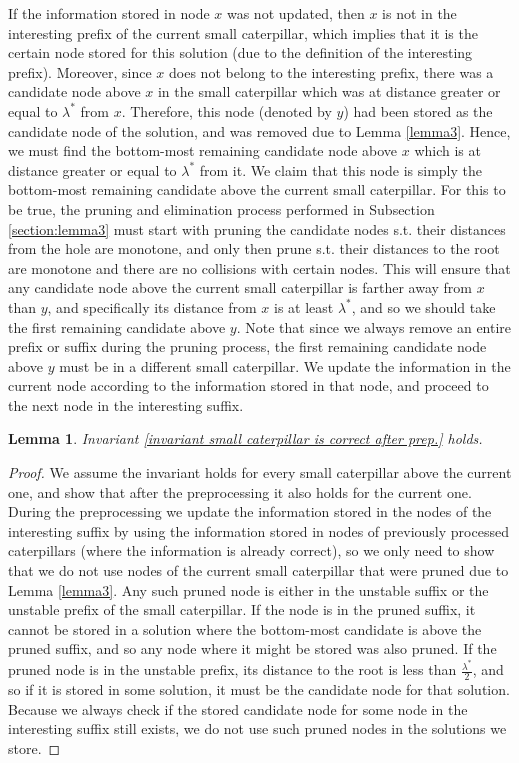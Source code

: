 \documentclass[11pt,a4paper]{article}
\newcounter{mycounter}
\newenvironment{noindlist}
 {\begin{list}{\arabic{mycounter}.~~}{\usecounter{mycounter} \labelsep=0em \labelwidth=0em \leftmargin=0em \itemindent=0em}}
 {\end{list}}
\newtheorem{lemma}{Lemma}
\theoremstyle{definition}
\theoremstyle{remark}
\begin{document}
\begin{noindlist}
If the information stored in node $x$ was not updated, then $x$ is not in the interesting prefix of the current small caterpillar, which implies that it is the certain node stored for this solution (due to the definition of the interesting prefix). Moreover, since $x$ does not belong to the interesting prefix, there was a candidate node above $x$ in the small caterpillar which was at distance greater or equal to $\lambda^*$ from $x$. Therefore, this node (denoted by $y$) had been stored as the candidate node of the solution, and was removed due to Lemma \ref{lemma3}. Hence, we must find the bottom-most remaining candidate node above $x$ which is at distance greater or equal to $\lambda^*$ from it. We claim that this node is simply the bottom-most remaining candidate above the current small caterpillar. For this to be true, the pruning and elimination process performed in Subsection \ref{section:lemma3} must start with pruning the candidate nodes s.t. their distances from the hole are monotone, and only then prune s.t. their distances to the root are monotone and there are no collisions with certain nodes. This will ensure that any candidate node above the current small caterpillar is farther away from $x$ than $y$, and specifically its distance from $x$ is at least $\lambda^*$, and so we should take the first remaining candidate above $y$. Note that since we always remove an entire prefix or suffix during the pruning process, the first remaining candidate node above $y$ must be in a different small caterpillar. We update the information in the current node according to the information stored in that node, and proceed to the next node in the interesting suffix.



\end{noindlist}

\begin{lemma}
Invariant \ref{invariant small caterpillar is correct after prep.} holds.
\end{lemma}
\begin{proof}
We assume the invariant holds for every small caterpillar above the current one, and show that after the preprocessing it also holds for the current one. During the preprocessing we update the information stored in the nodes of the interesting suffix by using the information stored in nodes of previously processed caterpillars (where the information is already correct), so we only need to show that we do not use nodes of the current small caterpillar that were pruned due to Lemma \ref{lemma3}. Any such pruned node is either in the unstable suffix or the unstable prefix of the small caterpillar. If the node is in the pruned suffix, it cannot be stored in a solution where the bottom-most candidate is above the pruned suffix, and so any node where it might be stored was also pruned. If the pruned node is in the unstable prefix, its distance to the root is less than $\frac{\lambda^*}{2}$, and so if it is stored in some solution, it must be the candidate node for that solution. Because we always check if the stored candidate node for some node in the interesting suffix still exists, we do not use such pruned nodes in the solutions we store.
\end{proof}
\end{document}
